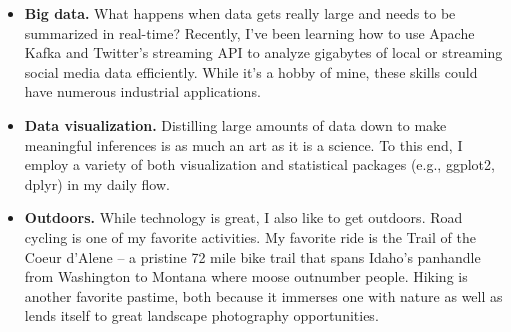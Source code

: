 \documentclass[11pt,a4paper,sans]{moderncv}        %
\begin{document}
\begin{itemize}



\item{\textbf{Big data.} What happens when data gets really large and needs to be summarized in real-time? Recently, I've been learning how to use Apache Kafka and Twitter's streaming API to analyze gigabytes of local or streaming social media data efficiently. While it's a hobby of mine, these skills could have numerous industrial applications.}

\vspace{6pt}

\item{\textbf{Data visualization.} Distilling large amounts of data down to make meaningful inferences is as much an art as it is a science. To this end, I employ a variety of both visualization and statistical packages (e.g., ggplot2, dplyr) in my daily flow.}

\vspace{6pt}

\item{\textbf{Outdoors.} While technology is great, I also like to get outdoors. Road cycling is one of my favorite activities. My favorite ride is the Trail of the Coeur d'Alene -- a pristine 72 mile bike trail that spans Idaho's panhandle from Washington to Montana where moose outnumber people. Hiking is another favorite pastime, both because it immerses one with nature as well as lends itself to great landscape photography opportunities.}



\end{itemize}

\end{document}
